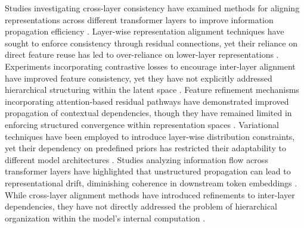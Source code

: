 Studies investigating cross-layer consistency have examined methods for aligning representations across different transformer layers to improve information propagation efficiency \cite{langston2024automated}. Layer-wise representation alignment techniques have sought to enforce consistency through residual connections, yet their reliance on direct feature reuse has led to over-reliance on lower-layer representations \cite{vima2024enhancing}. Experiments incorporating contrastive losses to encourage inter-layer alignment have improved feature consistency, yet they have not explicitly addressed hierarchical structuring within the latent space \cite{aguiluz2024dynamic}. Feature refinement mechanisms incorporating attention-based residual pathways have demonstrated improved propagation of contextual dependencies, though they have remained limited in enforcing structured convergence within representation spaces \cite{kingston2024adaptive}. Variational techniques have been employed to introduce layer-wise distribution constraints, yet their dependency on predefined priors has restricted their adaptability to different model architectures \cite{hubsch2024articulating}. Studies analyzing information flow across transformer layers have highlighted that unstructured propagation can lead to representational drift, diminishing coherence in downstream token embeddings \cite{forman2024dynamic}. While cross-layer alignment methods have introduced refinements to inter-layer dependencies, they have not directly addressed the problem of hierarchical organization within the model’s internal computation \cite{keith2024optimizing}.